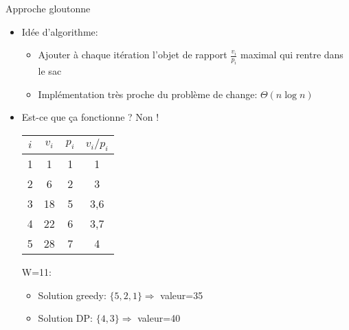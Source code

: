\begin{frame}{Approche gloutonne}

\begin{itemize}
\item Idée d'algorithme:
\begin{itemize}
\item Ajouter à chaque itération l'objet de rapport $\frac{v_i}{p_i}$ maximal qui rentre dans le sac
\item Implémentation très proche du problème de change: $\Theta(n\log n)$
\end{itemize}
\item Est-ce que ça fonctionne ? Non !
\begin{center}
\begin{tabular}{cccc}
$i$ & $v_i$ & $p_i$ & $v_i/p_i$\\
\hline
1 & 1 & 1 & 1\\
2 & 6 & 2 & 3\\
3 & 18 & 5 & 3,6\\
4 & 22 & 6 & 3,7\\
5 & 28 & 7 & 4\\
\end{tabular}
\end{center}
W=11:
\begin{itemize}
\item Solution greedy: $\{5,2,1\} \Rightarrow$ valeur=35
\item Solution DP: $\{4,3\} \Rightarrow$ valeur=40
\end{itemize}
\end{itemize}
\end{frame}


